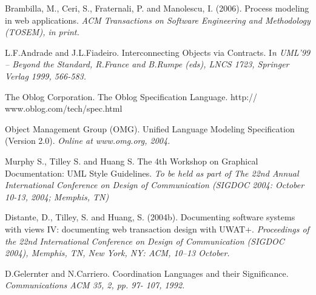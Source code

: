 \documentclass[12 pt,a4paper]{llncs}
\begin{document}
\begin{thebibliography}{1}

Brambilla, M., Ceri, S., Fraternali, P. and Manolescu, I. (2006).{ Process modeling in web
applications.} \textit{ACM Transactions on Software Engineering and Methodology (TOSEM), in print.}



L.F.Andrade and J.L.Fiadeiro. {Interconnecting Objects via Contracts.}  I\textit{n UML'99 – Beyond the Standard,
R.France and B.Rumpe (eds), LNCS 1723, Springer Verlag 1999, 566-583.}



The Oblog Corporation. {The Oblog Specification Language.}  http:// www.oblog.com/tech/spec.html


 Object Management Group (OMG). {Unified Language
Modeling Specification (Version 2.0).} \textit{Online at
www.omg.org, 2004.}



Murphy  S., Tilley S. and Huang S. {The 4th Workshop on
Graphical Documentation: UML Style Guidelines.} \textit{To be
held as part of The 22nd Annual International Conference on
Design of Communication (SIGDOC 2004: October 10-13,
2004; Memphis, TN)}


Distante, D., Tilley, S. and Huang, S. (2004b). {Documenting software systems with views IV:
documenting web transaction design with UWAT+.} \textit{Proceedings of the 22nd International
Conference on Design of Communication (SIGDOC 2004), Memphis, TN, New York, NY:
ACM, 10–13 October.}



D.Gelernter and N.Carriero. {Coordination Languages and
their Significance}.\textit{ Communications ACM 35, 2, pp. 97-
107, 1992.}

\end{thebibliography}
\end{document}
